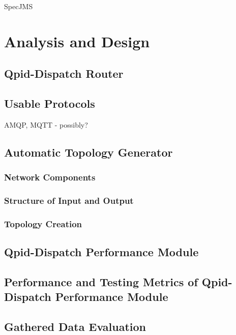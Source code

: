 SpecJMS

\chapter{Analysis and Design}
\label{Analysis and Design}

\section{Qpid-Dispatch Router}

\section{Usable Protocols}
AMQP, MQTT - possibly?

\section{Automatic Topology Generator}

\subsection{Network Components}

\subsection{Structure of Input and Output}

\subsection{Topology Creation}

\section{Qpid-Dispatch Performance Module}

\subsection{}

\section{Performance and Testing Metrics of Qpid-Dispatch Performance Module}

\section{Gathered Data Evaluation}

